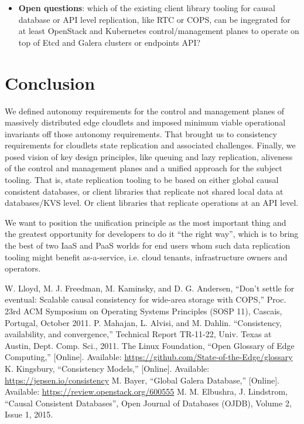 \documentclass[conference]{IEEEtran}
\begin{document}
\begin{itemize}
  \item \textbf{Open questions}: which of the existing client library tooling
    for causal database or API level replication, like RTC or COPS, can be
    ingegrated for at least OpenStack and Kubernetes control/management planes
    to operate on top of Etcd and Galera clusters or endpoints API?
\end{itemize}

\section{Conclusion}

We defined autonomy requirements for the control and management planes of
massively distributed edge cloudlets and imposed minimum viable operational
invariants off those autonomy requirements. That brought us to consistency
requirements for cloudlets state replication and associated challenges.
Finally, we posed vision of key design principles, like queuing and lazy
replication, aliveness of the control and management planes and a unified
approach for the subject tooling. That is, state replication tooling to be
based on either global causal consistent databases, or client libraries that
replicate not shared local data at databases/KVS level. Or client libraries that
replicate operations at an API level.

We want to position the unification principle as the most important thing and
the greatest opportunity for developers to do it ``the right way'', which is to
bring the best of two IaaS and PaaS worlds for end users whom such data
replication tooling might benefit as-a-service, i.e. cloud tenants,
infrastructure owners and operators.

\begin{thebibliography}{00}
 W. Lloyd, M. J. Freedman, M. Kaminsky, and D. G. Andersen, ``Don’t settle for eventual: Scalable causal consistency for wide-area storage with COPS,'' Proc. 23rd ACM Symposium on Operating Systems Principles (SOSP 11), Cascais, Portugal, October 2011.
 P. Mahajan, L. Alvisi, and M. Dahlin. ``Consistency, availability, and convergence,'' Technical Report TR-11-22, Univ. Texas at Austin, Dept. Comp. Sci., 2011.
 The Linux Foundation, ``Open Glossary of Edge Computing,'' [Online]. Available: \url{https://github.com/State-of-the-Edge/glossary}
 K. Kingsbury, ``Consistency Models,'' [Online]. Available: \url{https://jepsen.io/consistency}
 M. Bayer, ``Global Galera Database,'' [Online]. Available: \url{https://review.openstack.org/600555}
 M. M. Elbushra, J. Lindstrom, ``Causal Consistent Databases'', Open Journal of Databases (OJDB), Volume 2, Issue 1, 2015.
\end{thebibliography}
\end{document}
